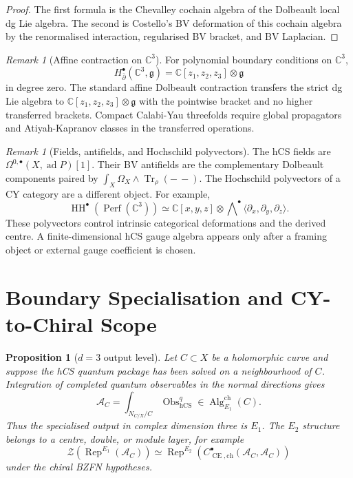 \documentclass[11pt]{amsart}
\providecommand{\C}{\mathbb{C}}
\providecommand{\dbar}{\bar{\partial}}
\providecommand{\fg}{\mathfrak{g}}
\providecommand{\Tr}{\operatorname{Tr}}
\providecommand{\Rep}{\operatorname{Rep}}
\providecommand{\Perf}{\operatorname{Perf}}
\providecommand{\HH}{\operatorname{HH}}
\providecommand{\Obs}{\operatorname{Obs}}
\providecommand{\CE}{\operatorname{CE}}
\providecommand{\hCS}{\operatorname{hCS}}
\providecommand{\cZ}{\mathcal{Z}}
\providecommand{\Eone}{E_1}
\providecommand{\Etwo}{E_2}
\theoremstyle{plain}
\newtheorem{proposition}[theorem]{Proposition}
\theoremstyle{definition}
\theoremstyle{remark}
\newtheorem{remark}[theorem]{Remark}
\begin{document}
\begin{proof}
The first formula is the Chevalley cochain algebra of the Dolbeault
local dg Lie algebra.  The second is Costello's BV deformation of this
cochain algebra by the renormalised interaction, regularised BV bracket,
and BV Laplacian.
\end{proof}

\begin{remark}[Affine contraction on $\C^3$]
\label{rem:affine-contraction}
For polynomial boundary conditions on $\C^3$,
\[
  H^\bullet_{\dbar}(\C^3,\fg)
  =
  \C[z_1,z_2,z_3]\otimes\fg
\]
in degree zero.  The standard affine Dolbeault contraction transfers
the strict dg Lie algebra to
$\C[z_1,z_2,z_3]\otimes\fg$ with the pointwise bracket and no higher
transferred brackets. Compact Calabi-Yau threefolds require global
propagators and Atiyah-Kapranov classes in the transferred operations.
\end{remark}

\begin{remark}[Fields, antifields, and Hochschild polyvectors]
\label{rem:separation}
The hCS fields are $\Omega^{0,\bullet}(X,\operatorname{ad}P)[1]$.
Their BV antifields are the complementary Dolbeault components paired
by $\int_X\Omega_X\wedge\Tr_\rho(-\, -)$.  The Hochschild polyvectors of
a CY category are a different object.  For example,
\[
  \HH^\bullet(\Perf(\C^3))
  \simeq
  \C[x,y,z]\otimes
  \bigwedge\nolimits^\bullet
  \langle \partial_x,\partial_y,\partial_z\rangle .
\]
These polyvectors control intrinsic categorical deformations and the
derived centre.  A finite-dimensional hCS gauge algebra appears only
after a framing object or external gauge coefficient is chosen.
\end{remark}

\section{Boundary Specialisation and CY-to-Chiral Scope}
\label{sec:boundary-phi-scope}

\begin{proposition}[$d=3$ output level]
\label{prop:d3-output-level}
Let $C\subset X$ be a holomorphic curve and suppose the hCS quantum
package has been solved on a neighbourhood of $C$.  Integration of
completed quantum observables in the normal directions gives
\[
  \mathcal A_C
  =
  \int_{N_{C/X}/C}\Obs^q_{\hCS}
  \in
  \operatorname{Alg}^{\mathrm{ch}}_{\Eone}(C).
\]
Thus the specialised output in complex dimension three is $\Eone$.
The $\Etwo$ structure belongs to a centre, double, or module layer, for
example
\[
  \cZ\!\left(\Rep^{\Eone}(\mathcal A_C)\right)
  \simeq
  \Rep^{\Etwo}\!\left(
    C^\bullet_{\CE,\mathrm{ch}}(\mathcal A_C,\mathcal A_C)
  \right)
\]
under the chiral BZFN hypotheses.
\end{proposition}
\end{document}
